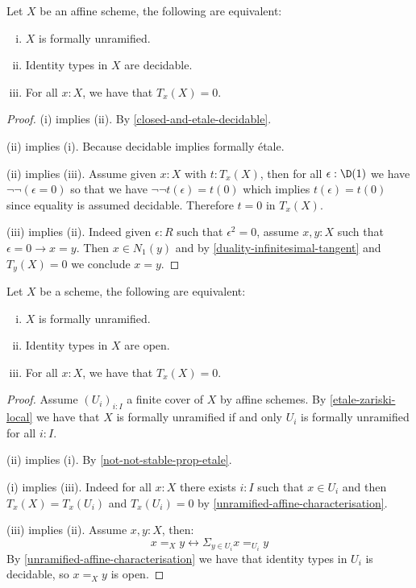 
\begin{lemma}\label{unramified-affine-characterisation}
Let $X$ be an affine scheme, the following are equivalent:
\begin{enumerate}[(i)]
\item $X$ is formally unramified.
\item Identity types in $X$ are decidable.
\item For all $x:X$, we have that $T_x(X)=0$.
\end{enumerate}
\end{lemma}

\begin{proof}
(i) implies (ii). By \cref{closed-and-etale-decidable}.

(ii) implies (i). Because decidable implies formally étale.

(ii) implies (iii). Assume given $x:X$ with $t:T_x(X)$, then for all $\epsilon:\D(1)$ we have $\neg\neg(\epsilon = 0)$ so that we have $\neg\neg t(\epsilon) = t(0)$ which implies $t(\epsilon) = t(0)$ since equality is assumed decidable. Therefore $t = 0$ in $T_x(X)$.

(iii) implies (ii). Indeed given $\epsilon:R$ such that $\epsilon^2=0$, assume $x,y:X$ such that $\epsilon=0 \to x=y$. Then $x\in N_1(y)$ and by \cref{duality-infinitesimal-tangent} and $T_y(X)=0$ we conclude $x=y$.
\end{proof}

\begin{corollary}\label{unramified-scheme-characterisation}
Let $X$ be a scheme, the following are equivalent:
\begin{enumerate}[(i)]
\item $X$ is formally unramified.
\item Identity types in $X$ are open.
\item For all $x:X$, we have that $T_x(X)=0$.
\end{enumerate}
\end{corollary}

\begin{proof}
Assume $(U_i)_{i:I}$ a finite cover of $X$ by affine schemes. By \cref{etale-zariski-local} we have that $X$ is formally unramified if and only $U_i$ is formally unramified for all $i:I$.

(ii) implies (i). By \cref{not-not-stable-prop-etale}.

(i) implies (iii). Indeed for all $x:X$ there exists $i:I$ such that $x\in U_i$ and then $T_x(X) = T_x(U_i)$ and $T_x(U_i) = 0$ by \cref{unramified-affine-characterisation}.

(iii) implies (ii). Assume $x,y:X$, then:
\[x=_Xy \leftrightarrow \Sigma_{y\in U_i} x=_{U_i} y\]
By \cref{unramified-affine-characterisation} we have that identity types in $U_i$ is decidable, so $x=_Xy$ is open.
\end{proof}

